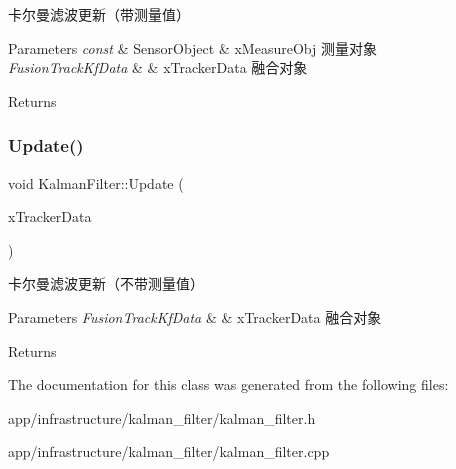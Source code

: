 卡尔曼滤波更新（带测量值） 


\begin{DoxyParams}{Parameters}
{\em const} & Sensor\+Object \& x\+Measure\+Obj 测量对象 \\
\hline
{\em Fusion\+Track\+Kf\+Data} & \& x\+Tracker\+Data 融合对象 \\
\hline
\end{DoxyParams}
\begin{DoxyReturn}{Returns}

\end{DoxyReturn}
\mbox{\label{classKalmanFilter_a6732a1548fd88786a44edd76854913b2}} 
\subsubsection{\texorpdfstring{Update()}{Update()}\hspace{0.1cm}{\footnotesize\ttfamily [2/2]}}
{\footnotesize\ttfamily void Kalman\+Filter\+::\+Update (\begin{DoxyParamCaption}\item[{Fusion\+Track\+Kf\+Data \&}]{x\+Tracker\+Data }\end{DoxyParamCaption})}



卡尔曼滤波更新（不带测量值） 


\begin{DoxyParams}{Parameters}
{\em Fusion\+Track\+Kf\+Data} & \& x\+Tracker\+Data 融合对象 \\
\hline
\end{DoxyParams}
\begin{DoxyReturn}{Returns}

\end{DoxyReturn}


The documentation for this class was generated from the following files\+:\begin{DoxyCompactItemize}
\item 
app/infrastructure/kalman\+\_\+filter/kalman\+\_\+filter.\+h\item 
app/infrastructure/kalman\+\_\+filter/kalman\+\_\+filter.\+cpp\end{DoxyCompactItemize}
